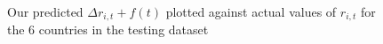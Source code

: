 \documentclass[11pt]{article}
\begin{document}
\begin{figure}[!hbt]
    \hfil
    \caption{Our predicted $\Delta r_{i,t} + f(t)$ plotted against actual values of $r_{i,t}$ for the 6 countries in the testing dataset}\label{fig:6_country_predictions}
\end{figure}
\nocite{*}


\newpage

\appendix
\end{document}
